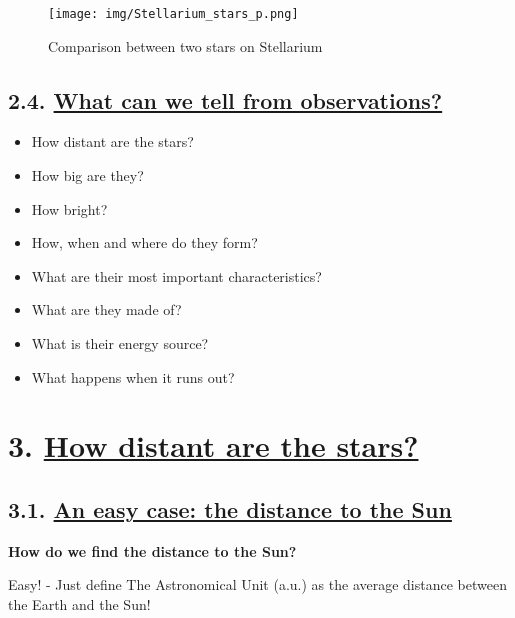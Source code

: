 \documentclass[
  letterpaper,
  DIV=11,
  numbers=noendperiod]{scrartcl}
\providecommand{\tightlist}{%
  \setlength{\itemsep}{0pt}\setlength{\parskip}{0pt}}\usepackage{longtable,booktabs,array}
\begin{document}
\begin{figure}

{\centering \texttt{[image: img/Stellarium\_stars\_p.png]}

}

\caption{Comparison between two stars on Stellarium}

\end{figure}

\hypertarget{what-can-we-tell-from-observations}{%
\subsection{\texorpdfstring{2.4. \protect\hyperlink{toc0_}{What can we
tell from
observations?}}{2.4. What can we tell from observations?}}\label{what-can-we-tell-from-observations}}

\begin{itemize}
\tightlist
\item
  How distant are the stars?
\item
  How big are they?
\item
  How bright?
\item
  How, when and where do they form?
\item
  What are their most important characteristics?
\item
  What are they made of?
\item
  What is their energy source?
\item
  What happens when it runs out?
\end{itemize}

\hypertarget{how-distant-are-the-stars}{%
\section{\texorpdfstring{3. \protect\hyperlink{toc0_}{How distant are
the
stars?}}{3. How distant are the stars?}}\label{how-distant-are-the-stars}}

\hypertarget{an-easy-case-the-distance-to-the-sun}{%
\subsection{\texorpdfstring{3.1. \protect\hyperlink{toc0_}{An easy case:
the distance to the
Sun}}{3.1. An easy case: the distance to the Sun}}\label{an-easy-case-the-distance-to-the-sun}}

\textbf{How do we find the distance to the Sun?}

Easy! - Just define The Astronomical Unit (a.u.) as the average distance
between the Earth and the Sun!
\end{document}
